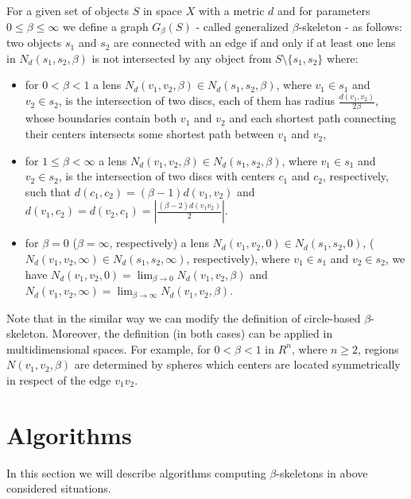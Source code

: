 \documentclass[11pt]{llncs}
\begin{document}
\begin{definition}
\label{betaskeletons5}
For a given set of objects $S$ in space $X$ with a metric $d$ and for parameters 
$0 \leq \beta \leq \infty$ we define a graph $G_{\beta}(S)$ - called generalized $\beta$-skeleton -
as follows: 
two objects $s_1$ and $s_2$ are connected with an edge if and only if  
at least one lens in $N_d(s_1,s_2,\beta)$ is not intersected by any object from 
$S \setminus \{s_1, s_2\}$ where:
\begin{itemize}
\item
for $0<\beta<1$ a lens $N_d(v_1,v_2,\beta) \in N_d(s_1,s_2,\beta)$, where $v_1 \in s_1$ 
and $v_2 \in s_2$, is the intersection of two discs, each of them has radius 
$\frac{d(v_1,v_2)}{2 \beta}$, whose boundaries contain both $v_1$ and $v_2$ and each shortest
path connecting their centers intersects some shortest path between $v_1$ and $v_2$, 

\item
for $1 \leq \beta<\infty$ a lens $N_d(v_1,v_2,\beta) \in N_d(s_1,s_2,\beta)$, where $v_1 \in s_1$ 
and $v_2 \in s_2$, is the intersection of two discs with centers $c_1$ and $c_2$, respectively,
such that $d(c_1, c_2)=(\beta -1)d(v_1,v_2)$ and 
$d(v_1, c_2)=d(v_2,c_1)=|\frac{(\beta -2) d(v_1v_2)}{2}|$.

\item
for  $\beta=0$ ($\beta=\infty$, respectively) a lens $N_d(v_1,v_2,0) \in N_d(s_1,s_2,0)$, 
($N_d(v_1,v_2,\infty) \in N_d(s_1,s_2,\infty)$, respectively), where $v_1 \in s_1$ 
and $v_2 \in s_2$, we have  
$N_d(v_1,v_2,0)=\lim_{\beta \rightarrow 0} N_d(v_1,v_2, \beta)$ and 
$N_d(v_1,v_2, \infty)=\lim_{\beta \rightarrow \infty} N_d(v_1,v_2, \beta)$.
 
\end{itemize}
\end{definition}

Note that in the similar way we can modify the definition of circle-based $\beta$-skeleton.
Moreover, the definition (in both cases) can be applied in multidimensional spaces.  
For example, for $0 < \beta < 1$ in $R^n$, where $n \geq 2$, regions $N(v_1,v_2,\beta)$ are 
determined by spheres which centers are located symmetrically in respect of the edge $v_1v_2$. 


\section{Algorithms}


In this section we will describe algorithms computing $\beta$-skeletons in above considered
situations.\\
\end{document}
